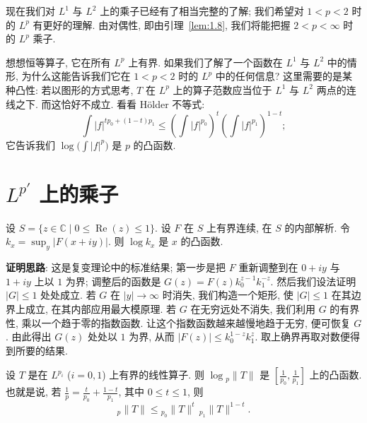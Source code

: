 \begin{remark}\label{rem:1.11}
现在我们对 $L^1$ 与 $L^2$ 上的乘子已经有了相当完整的了解; 我们希望对 $1<p<2$ 时的 $L^p$ 有更好的理解. 由对偶性, 即由引理~\ref{lem:1.8}, 我们将能把握 $2<p<\infty$ 时的 $L^p$ 乘子.

想想恒等算子, 它在所有 $L^p$ 上有界. 如果我们了解了一个函数在 $L^1$ 与 $L^2$ 中的情形, 为什么这能告诉我们它在 $1<p<2$ 时的 $L^p$ 中的任何信息? 这里需要的是某种凸性: 若以图形的方式思考, $T$ 在 $L^p$ 上的算子范数应当位于 $L^1$ 与 $L^2$ 两点的连线之下. 而这恰好不成立. 看看 H\"older 不等式:
\[
\int|f|^{tp_0+(1-t)p_1}\leq\left(\int|f|^{p_0}\right)^{t}\left(\int|f|^{p_1}\right)^{1-t};
\]
它告诉我们 $\log\bigl(\int|f|^p\bigr)$ 是 $p$ 的凸函数.
\end{remark}

\section{\texorpdfstring{$L^{p'}$}{Lp'} 上的乘子}
\label{sec:1.2}

\begin{theorem}[三线定理]\label{thm:1.12}
设 $S=\{z\in\mathbb{C} \mid 0\leq\operatorname{Re}(z)\leq 1\}$. 设 $F$ 在 $S$ 上有界连续, 在 $S$ 的内部解析. 令 $k_x=\sup_y|F(x+iy)|$. 则 $\log k_x$ 是 $x$ 的凸函数.
\end{theorem}

\textbf{证明思路}: 这是复变理论中的标准结果; 第一步是把 $F$ 重新调整到在 $0+iy$ 与 $1+iy$ 上以 $1$ 为界; 调整后的函数是 $G(z)=F(z)k_0^{z-1}k_1^{-z}$. 然后我们设法证明 $|G|\leq 1$ 处处成立. 若 $G$ 在 $|y|\to\infty$ 时消失, 我们构造一个矩形, 使 $|G|\leq 1$ 在其边界上成立, 在其内部应用最大模原理. 若 $G$ 在无穷远处不消失, 我们利用 $G$ 的有界性, 乘以一个趋于零的指数函数. 让这个指数函数越来越慢地趋于无穷, 便可恢复 $G$. 由此得出 $G(z)$ 处处以 $1$ 为界, 从而 $|F(z)|\leq k_0^{1-z}k_1^{z}$. 取上确界再取对数便得到所要的结果.

\begin{theorem}\label{thm:1.13}
设 $T$ 是在 $L^{p_i}$ ($i=0,1$) 上有界的线性算子. 则 $\log{}_p\|T\|$ 是 $\left[\frac{1}{p_0},\frac{1}{p_1}\right]$ 上的凸函数. 也就是说, 若 $\frac{1}{p}=\frac{t}{p_0}+\frac{1-t}{p_1}$, 其中 $0\leq t\leq 1$, 则
\[
{}_p\|T\|\leq{}_{p_0}\|T\|^{t}\,{}_{p_1}\|T\|^{1-t}.
\]
\end{theorem}

